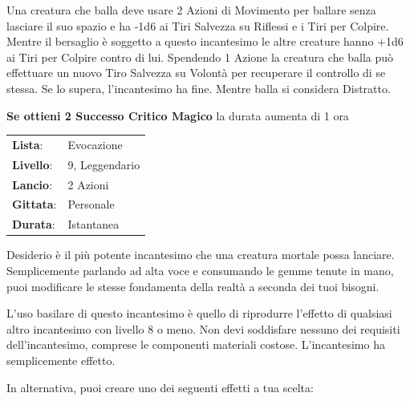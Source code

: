 \begin{multicols}{2}
Una creatura che balla deve usare 2 Azioni di Movimento per ballare senza lasciare il suo spazio e ha -1d6 ai Tiri Salvezza su Riflessi e i Tiri per Colpire. Mentre il bersaglio è soggetto a questo incantesimo le altre creature hanno +1d6 ai Tiri per Colpire contro di lui. Spendendo 1 Azione la creatura che balla può effettuare un nuovo Tiro Salvezza su Volontà per recuperare il controllo di se stessa. Se lo supera, l'incantesimo ha fine. Mentre balla si considera Distratto.

\textbf{Se ottieni 2 Successo Critico Magico} la durata aumenta di 1 ora

\noindent\begin{tabularx}{\linewidth}{p{1.3cm}X}
	\rowcolor{gray!20}\textbf{Lista}: & Evocazione \\
	\textbf{Livello}: & 9, Leggendario \\
	\rowcolor{gray!20}\textbf{Lancio}: & 2 Azioni \\
	\textbf{Gittata}: & Personale \\
	\rowcolor{gray!20}\textbf{Durata}: & Istantanea \\
\end{tabularx}\smallskip

Desiderio è il più potente incantesimo che una creatura mortale possa lanciare. Semplicemente parlando ad alta voce e consumando le gemme tenute in mano, puoi modificare le stesse fondamenta della realtà a seconda dei tuoi bisogni.

L'uso basilare di questo incantesimo è quello di riprodurre l'effetto di qualsiasi altro incantesimo con livello 8 o meno. Non devi soddisfare nessuno dei requisiti dell'incantesimo, comprese le componenti materiali costose. L'incantesimo ha semplicemente effetto.

In alternativa, puoi creare uno dei seguenti effetti a tua scelta:


\end{multicols}
